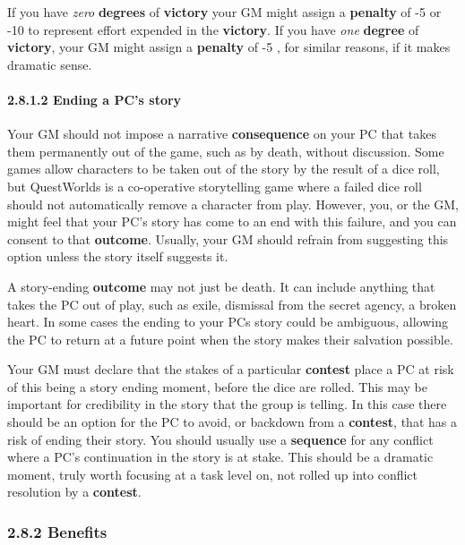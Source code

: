 \documentclass[
  11pt,
]{article}
\begin{document}
If you have \emph{zero} \textbf{degrees} of \textbf{victory} your GM
might assign a \textbf{penalty} of -5 or -10 to represent effort
expended in the \textbf{victory}. If you have \emph{one} \textbf{degree}
of \textbf{victory}, your GM might assign a \textbf{penalty} of -5 , for
similar reasons, if it makes dramatic sense.

\hypertarget{ending-a-pcs-story}{%
\paragraph{2.8.1.2 Ending a PC's story}\label{ending-a-pcs-story}}

Your GM should not impose a narrative \textbf{consequence} on your PC
that takes them permanently out of the game, such as by death, without
discussion. Some games allow characters to be taken out of the story by
the result of a dice roll, but QuestWorlds is a co-operative
storytelling game where a failed dice roll should not automatically
remove a character from play. However, you, or the GM, might feel that
your PC's story has come to an end with this failure, and you can
consent to that \textbf{outcome}. Usually, your GM should refrain from
suggesting this option unless the story itself suggests it.

A story-ending \textbf{outcome} may not just be death. It can include
anything that takes the PC out of play, such as exile, dismissal from
the secret agency, a broken heart. In some cases the ending to your PCs
story could be ambiguous, allowing the PC to return at a future point
when the story makes their salvation possible.

Your GM must declare that the stakes of a particular \textbf{contest}
place a PC at risk of this being a story ending moment, before the dice
are rolled. This may be important for credibility in the story that the
group is telling. In this case there should be an option for the PC to
avoid, or backdown from a \textbf{contest}, that has a risk of ending
their story. You should usually use a \textbf{sequence} for any conflict
where a PC's continuation in the story is at stake. This should be a
dramatic moment, truly worth focusing at a task level on, not rolled up
into conflict resolution by a \textbf{contest}.

\hypertarget{benefits}{%
\subsubsection{2.8.2 Benefits}\label{benefits}}
\end{document}
